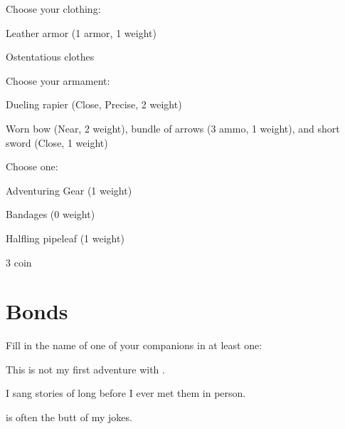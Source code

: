 Choose your clothing:

         
\startitemize[1,packed]
           
\item Leather armor  (1 armor, 1 weight)

           
\item Ostentatious clothes

         
\stopitemize
         

Choose your armament:

         
\startitemize[1,packed]
           
\item Dueling rapier (Close, Precise, 2 weight)

           
\item Worn bow (Near, 2 weight), bundle of arrows (3 ammo, 1 weight), and short sword (Close, 1 weight)

         
\stopitemize
         

Choose one:

         
\startitemize[1,packed]
           
\item Adventuring Gear (1 weight)

           
\item Bandages (0 weight)

           
\item Halfling pipeleaf (1 weight)

           
\item 3 coin

         
\stopitemize
       

       
\section{Bonds}   
       

         

Fill in the name of one of your companions in at least one:

         

This is not my first adventure with \thinrules[n=2].

         

I sang stories of \thinrules[n=2] long before I ever met them in person.

         

\thinrules[n=2] is often the butt of my jokes.

         

